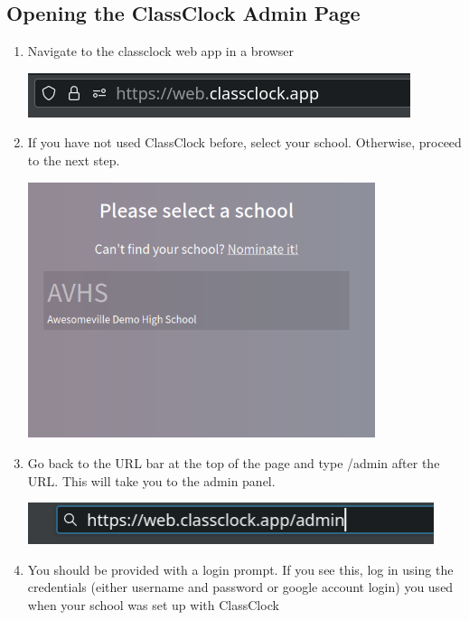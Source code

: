 \documentclass{article}
\begin{document}
\subsection{Opening the ClassClock Admin Page}
\begin{enumerate}
\item {Navigate to the classclock web app in a browser}
\begin{center}
\includegraphics[width=4.4055in,height=0.5102in]{images/regular-urlbar.png}
\end{center}
\item {If you have not used ClassClock before, select your school. Otherwise, proceed to the next step.}
\begin{center}
\includegraphics[width=0.8\textwidth]{images/select-school2.png}
\end{center}
\item {Go back to the URL bar at the top of the page and type /admin after the URL. This will take you to the admin panel.}
\begin{center}
\includegraphics[width=4.6866in,height=0.4783in]{images/admin-urlbr.png}
\end{center}
\item {You should be provided with a login prompt. If you see this, log in using the credentials (either username and password
or google account login) you used when your school was set up with ClassClock}


\end{enumerate}
\end{document}
